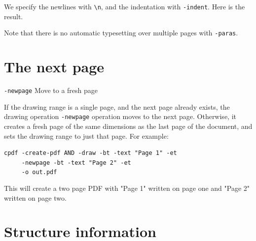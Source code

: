 \documentclass{book}
\begin{document}
\noindent We specify the newlines with \texttt{\textbackslash n}, and the indentation with \texttt{-indent}. Here is the result.

\noindent

\bigskip
{}
\bigskip

\noindent Note that there is no automatic typesetting over multiple pages with \texttt{-paras}.

\section{The next page}

  {\small\begin{framed}
   \vspace{1.5mm}
   \noindent\verb!-newpage! Move to a fresh page
  \end{framed}}

If the drawing range is a single page, and the next page already exists, the drawing operation \texttt{-newpage} operation moves to the next page. Otherwise, it creates a fresh page of the same dimensions as the last page of the document, and sets the drawing range to just that page. For example:

\begin{framed}
 \noindent\small\verb?cpdf -create-pdf AND -draw -bt -text "Page 1" -et?\\
 \noindent\small\verb?     -newpage -bt -text "Page 2" -et?\\
 \noindent\small\verb?     -o out.pdf?
\end{framed}

\noindent This will create a two page PDF with "Page 1" written on page one and "Page 2" written on page two.

\section{Structure information}
\end{document}

